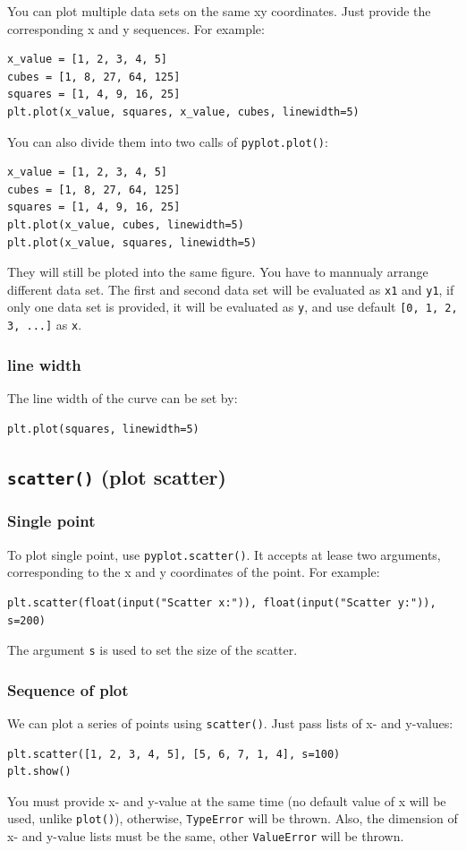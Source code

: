 \documentclass[12pt]{book}
\begin{document}
You can plot multiple data sets on the same xy coordinates. Just provide the corresponding x and y sequences. For example:
\begin{verbatim}
x_value = [1, 2, 3, 4, 5]
cubes = [1, 8, 27, 64, 125]
squares = [1, 4, 9, 16, 25]
plt.plot(x_value, squares, x_value, cubes, linewidth=5)
\end{verbatim}

You can also divide them into two calls of \texttt{pyplot.plot()}:
\begin{verbatim}
x_value = [1, 2, 3, 4, 5]
cubes = [1, 8, 27, 64, 125]
squares = [1, 4, 9, 16, 25]
plt.plot(x_value, cubes, linewidth=5)
plt.plot(x_value, squares, linewidth=5)
\end{verbatim}
They will still be ploted into the same figure. You have to mannualy arrange different data set. The first and second data set will be evaluated as \texttt{x1} and \texttt{y1}, if only one data set is provided, it will be evaluated as \texttt{y}, and use default \texttt{[0, 1, 2, 3, ...]} as \texttt{x}.
\subsubsection{line width}
\label{sec:org69b9110}
The line width of the curve can be set by:
\begin{verbatim}
plt.plot(squares, linewidth=5)
\end{verbatim}

\subsection{\texttt{scatter()} (plot scatter)}
\label{sec:org417f0af}
\subsubsection{Single point}
\label{sec:org5be1c86}
To plot single point, use \texttt{pyplot.scatter()}. It accepts at lease two arguments, corresponding to the x and y coordinates of the point. For example:
\begin{verbatim}
plt.scatter(float(input("Scatter x:")), float(input("Scatter y:")), s=200)
\end{verbatim}
The argument \texttt{s} is used to set the size of the scatter.
\subsubsection{Sequence of plot}
\label{sec:org8e04dbb}
We can plot a series of points using \texttt{scatter()}. Just pass lists of x- and y-values:
\begin{verbatim}
plt.scatter([1, 2, 3, 4, 5], [5, 6, 7, 1, 4], s=100)
plt.show()
\end{verbatim}
You must provide x- and y-value at the same time (no default value of x will be used, unlike \texttt{plot()}), otherwise, \texttt{TypeError} will be thrown. Also, the dimension of x- and y-value lists must be the same, other \texttt{ValueError} will be thrown.
\end{document}
